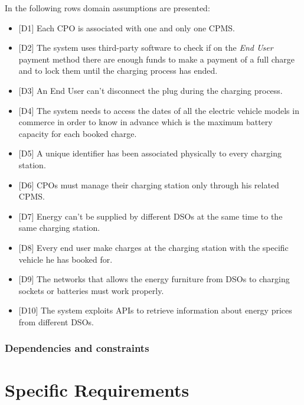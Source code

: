 \documentclass[a4paper]{report}
\begin{document}
In the following rows domain assumptions are presented:
\begin{itemize}
\item{[D1]} \label{D1} Each CPO is associated with one and only one CPMS.
\item{[D2]} \label{D2} The system uses third-party software to check if on the \textit{End User} payment method there are enough funds to make a payment of a full charge and to lock them until the charging process has ended.
\item{[D3]} \label{D3} An End User can't disconnect the plug during the charging process.
\item{[D4]} \label{D4} The system needs to access the dates of all the electric vehicle models in commerce in order to know in advance which is the maximum battery capacity for each booked charge.
\item{[D5]} \label{D5} A unique identifier has been associated physically to every charging station.
\item{[D6]} \label{D6} CPOs must manage their charging station only through his related CPMS.
\item{[D7]} \label{D7} Energy can't be supplied by different DSOs at the same time to the same charging station.
\item{[D8]} \label{D8} Every end user make charges at the charging station with the specific vehicle he has booked for.
\item{[D9]} \label{D9} The networks that allows the energy furniture from DSOs to charging sockets or batteries must work properly.
\item{[D10]} \label{D10} The system exploits APIs to retrieve information about energy prices from different DSOs.
\end{itemize}
\subsection{Dependencies and constraints}



\chapter{Specific Requirements}
\end{document}

